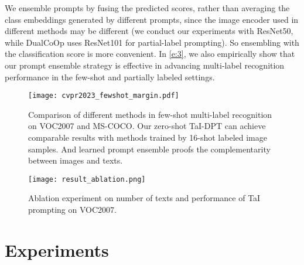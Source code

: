 \documentclass[10pt,twocolumn,letterpaper]{article}
\begin{document}
We ensemble prompts by fusing the predicted scores, rather than averaging the class embeddings generated by different prompts, since the image encoder used in different methods may be different (\eg we conduct our experiments with ResNet50, while DualCoOp uses ResNet101 for partial-label prompting). So ensembling with the classification score is more convenient.
In \cref{e:3}, we also empirically show that our prompt ensemble strategy is effective in advancing multi-label recognition performance in the few-shot and partially labeled settings.





























\begin{figure*}[h]
\begin{minipage}[t]{0.65\linewidth}
    \centering
    \texttt{[image: cvpr2023\_fewshot\_margin.pdf]}
\vspace{-8mm}
      \caption{Comparison of different methods in few-shot multi-label recognition on VOC2007 and MS-COCO. Our zero-shot TaI-DPT can achieve comparable results with methods trained by 16-shot labeled image samples. And learned prompt ensemble proofs the complementarity between images and texts.}
    \vspace{-6mm}
    \label{fig:fewshot}
\end{minipage}
\hfill
\begin{minipage}[t]{0.32\linewidth}
\centering
    \texttt{[image: result\_ablation.png]} \vspace{-6mm} \caption{Ablation experiment on number of texts and performance of TaI prompting on VOC2007.}
    \vspace{-6mm}
    \label{fig:ablation}
\end{minipage}

\end{figure*}



\section{Experiments}
\label{sec:experiments}
\end{document}
